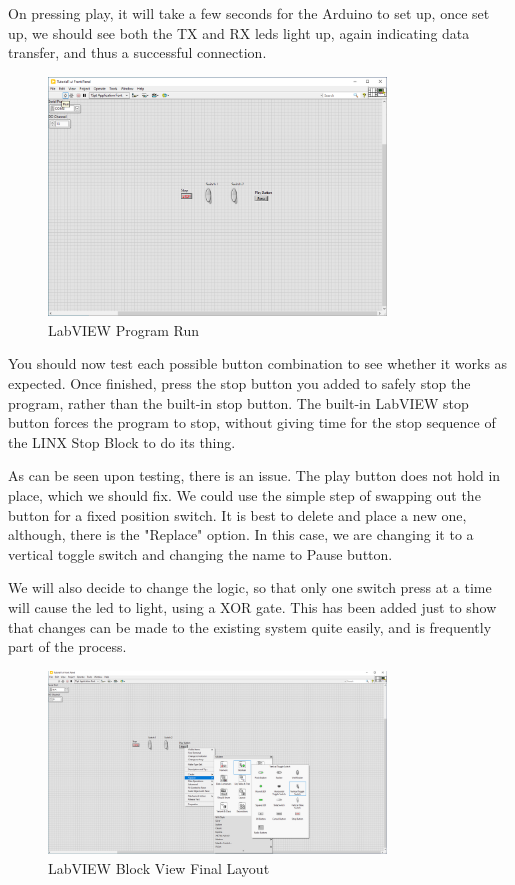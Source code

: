 \documentclass[a4paper,11pt]{report}
\begin{document}
On pressing play, it will take a few seconds for the Arduino to set up, once set up, we should see both the TX and RX \gls{led}s light up, again indicating data transfer, and thus a successful connection.

\begin{figure}[H]
\centering
\includegraphics[width=0.8\textwidth]{screenshots/labview30}
\caption{LabVIEW Program Run}
\end{figure}

You should now test each possible button combination to see whether it works as expected. Once finished, press the stop button you added to safely stop the program, rather than the built-in stop button. The built-in LabVIEW stop button forces the program to stop, without giving time for the stop sequence of the LINX Stop Block to do its thing.

As can be seen upon testing, there is an issue. The play button does not hold in place, which we should fix. We could use the simple step of swapping out the button for a fixed position switch. It is best to delete and place a new one, although, there is the "Replace" option. In this case, we are changing it to a vertical toggle switch and changing the name to Pause button.

We will also decide to change the logic, so that only one switch press at a time will cause the \gls{led} to light, using a XOR gate. This has been added just to show that changes can be made to the existing system quite easily, and is frequently part of the process.

\begin{figure}[H]
\centering
\includegraphics[width=0.8\textwidth]{screenshots/labview31}
\caption{LabVIEW Block View Final Layout}
\end{figure}
\end{document}
